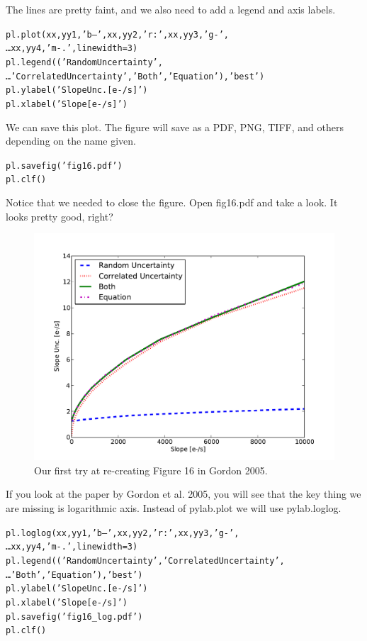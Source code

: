 The lines are pretty faint, and we also need to add a legend and axis
labels.

\begin{alltt}
\pytab pl.plot(xx,yy1,'b--',xx,yy2,'r:',xx,yy3,'g-',  
\ldots      xx,yy4,'m-.',linewidth=3) 
\pytab pl.legend(('Random Uncertainty',  
\ldots      'Correlated Uncertainty', 'Both','Equation'),'best') 
\pytab pl.ylabel('Slope Unc. [e-/s]')
\pytab pl.xlabel('Slope [e-/s]')
\end{alltt}

We can save this plot.  The figure will save as a PDF, PNG, TIFF, and
others depending on the name given.

\begin{alltt}
\pytab pl.savefig('fig16.pdf')
\pytab pl.clf()
\end{alltt}

Notice that we needed to close the figure.  Open fig16.pdf and take a
look.  It looks pretty good, right?  

\begin{figure}[tbp]
  \centering
    \includegraphics[scale=0.55]{splot.pdf}
    \caption{Our first try at re-creating Figure 16 in Gordon 2005.}
  \label{fig:splot}
\end{figure}

If you look at the paper by
Gordon et al. 2005, you will see that the key thing we are missing is
logarithmic axis.  Instead of {\sf \small pylab.plot} we will use {\sf
\small pylab.loglog}.

\begin{alltt}
\pytab pl.loglog(xx,yy1,'b--',xx,yy2,'r:',xx,yy3,'g-',  
\ldots     xx,yy4,'m-.',linewidth=3) 
\pytab pl.legend(('Random Uncertainty','Correlated Uncertainty',  
\ldots     'Both','Equation'),'best') 
\pytab pl.ylabel('Slope Unc. [e-/s]') 
\pytab pl.xlabel('Slope [e-/s]') 
\pytab pl.savefig('fig16_log.pdf')
\pytab pl.clf()
\end{alltt}

